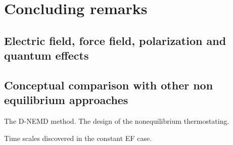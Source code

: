 \documentclass[a4paper,preprint,unsortedaddress,onecolumn]{revtex4-1}
\begin{document}






\section{Concluding remarks}
\subsection{Electric field, force field, polarization and quantum effects}
\subsection{Conceptual comparison with other non equilibrium approaches}

The D-NEMD method. The design of the nonequilibrium thermostating.

Time scales discovered in the constant EF case.
\end{document}
